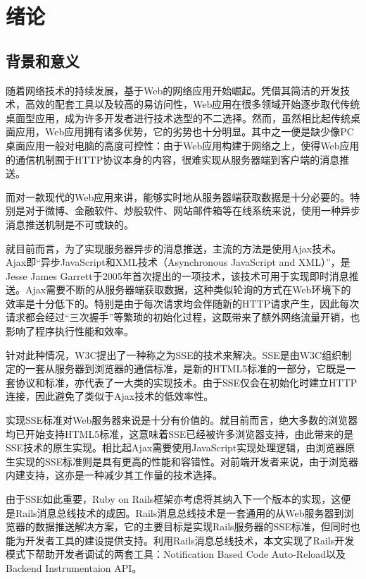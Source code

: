 \chapter{绪论}
\section{背景和意义}
随着网络技术的持续发展，基于Web的网络应用开始崛起。凭借其简洁的开发技术，高效的配套工具以及较高的易访问性，Web应用在很多领域开始逐步取代传统桌面型应用，成为许多开发者进行技术选型的不二选择。然而，虽然相比起传统桌面应用，Web应用拥有诸多优势，它的劣势也十分明显。其中之一便是缺少像PC桌面应用一般对电脑的高度可控性：由于Web应用构建于网络之上，使得Web应用的通信机制囿于HTTP协议本身的内容，很难实现从服务器端到客户端的消息推送。

而对一款现代的Web应用来讲，能够实时地从服务器端获取数据是十分必要的\supercite{why-live}。特别是对于微博、金融软件、炒股软件、网站邮件箱等在线系统来说，使用一种异步消息推送机制是不可或缺的。

就目前而言，为了实现服务器异步的消息推送，主流的方法是使用Ajax技术\supercite{ajax-book}。Ajax即“异步JavaScript和XML技术（Asynchronous JavaScript and XML）”，是Jesse James Garrett于2005年首次提出的一项技术，该技术可用于实现即时消息推送\supercite{ajax-intro}。Ajax需要不断的从服务器端获取数据，这种类似轮询的方式在Web环境下的效率是十分低下的。特别是由于每次请求均会伴随新的HTTP请求产生，因此每次请求都会经过“三次握手”等繁琐的初始化过程，这既带来了额外网络流量开销，也影响了程序执行性能和效率\supercite{ajax-apple}\supercite{ajax-sse}。

针对此种情况，W3C提出了一种称之为SSE的技术来解决\supercite{sse-w3c}。SSE是由W3C组织制定的一套从服务器到浏览器的通信标准，是新的HTML5标准的一部分，它既是一套协议和标准，亦代表了一大类的实现技术。由于SSE仅会在初始化时建立HTTP连接，因此避免了类似于Ajax技术的低效率性。

实现SSE标准对Web服务器来说是十分有价值的。就目前而言，绝大多数的浏览器均已开始支持HTML5标准，这意味着SSE已经被许多浏览器支持，由此带来的是SSE技术的原生实现。相比起Ajax需要使用JavaScript实现处理逻辑，由浏览器原生实现的SSE标准则是具有更高的性能和容错性。对前端开发者来说，由于浏览器内建支持，这亦是一种减少其工作量的技术选择。

由于SSE如此重要，Ruby on Rails框架亦考虑将其纳入下一个版本的实现，这便是Rails消息总线技术的成因。Rails消息总线技术是一套通用的从Web服务器到浏览器的数据推送解决方案，它的主要目标是实现Rails服务器的SSE标准，但同时也能为开发者工具的建设提供支持。利用Rails消息总线技术，本文实现了Rails开发模式下帮助开发者调试的两套工具：Notification Based Code Auto-Reload以及Backend Instrumentaion API。

